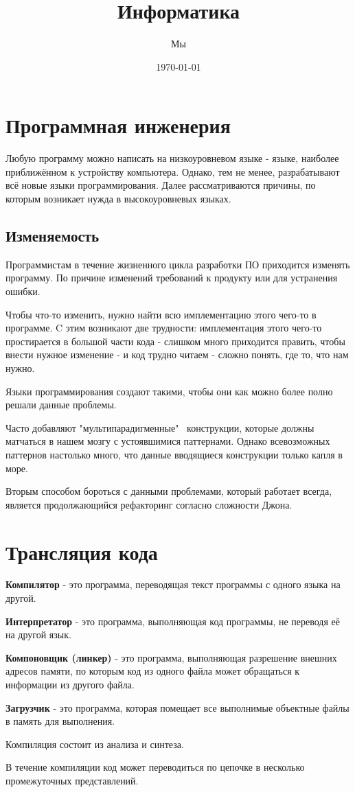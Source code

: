 \documentclass[oneside]{book}
\title{Информатика}
\date{\today}
\author{Мы}
\begin{document}
	\maketitle
    \tableofcontents
	\chapter{Программная инженерия}
	Любую программу можно написать на низкоуровневом
	языке - языке, наиболее приближённом к
	устройству компьютера. Однако, тем не менее,
	разрабатывают всё новые языки программирования.
	Далее рассматриваются причины, по которым
	возникает нужда в высокоуровневых языках.

	\section{Изменяемость}
	Программистам в течение жизненного цикла
	разработки ПО приходится изменять программу.
	По причине изменений требований к продукту
	или для устранения ошибки.

	Чтобы что-то изменить,
	нужно найти всю имплементацию этого чего-то
	в программе. C этим возникают две
	трудности: имплементация этого чего-то
	простирается в большой части кода -
	слишком много приходится править, чтобы
	внести нужное изменение -
	и код трудно читаем - сложно понять,
	где то, что нам нужно.

	Языки программирования создают такими,
	чтобы они как можно более полно
	решали данные проблемы.

	Часто добавляют "мультипарадигменные" \
	конструкции, которые должны матчаться в нашем мозгу
	с устоявшимися паттернами. Однако всевозможных
	паттернов настолько много, что данные вводящиеся
	конструкции только капля в море.

	Вторым способом бороться с данными проблемами,
	который работает всегда, является продолжающийся
	рефакторинг согласно сложности Джона.

    \chapter*{Трансляция кода}
    \textbf{Компилятор} - это программа,
    переводящая текст программы
    с одного языка на другой.

    \textbf{Интерпретатор} - это программа,
    выполняющая код программы,
    не переводя её на другой язык.

    \textbf{Компоновщик (линкер)} - это программа,
    выполняющая разрешение внешних
    адресов памяти, по которым код из одного
    файла может обращаться к информации из другого файла.

    \textbf{Загрузчик} - это программа,
    которая помещает все выполнимые
    объектные файлы в память для
    выполнения.

    Компиляция состоит из анализа и синтеза.

    В течение компиляции код может
    переводиться по цепочке в несколько
    промежуточных представлений.
\end{document}
